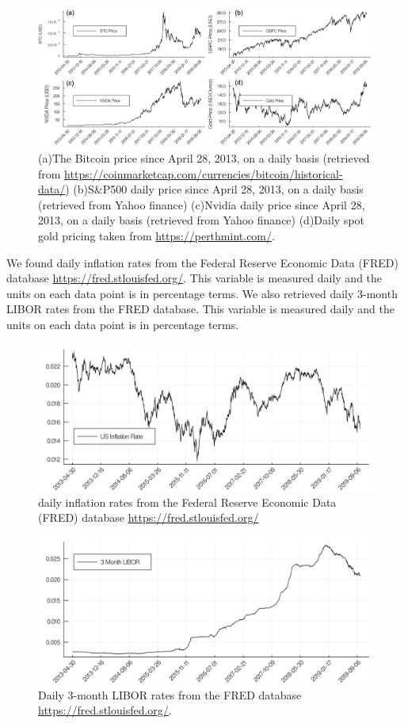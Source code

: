 \documentclass[9pt,twocolumn,twoside]{ilcss}
\begin{document}
\begin{figure}
\centering
\includegraphics[width=0.85\linewidth]{fig1to4.png}
\caption{(a)The Bitcoin price since April 28, 2013, on a daily basis (retrieved from \url{https://coinmarketcap.com/currencies/bitcoin/historical-data/}) (b)S\&P500 daily price since April 28, 2013, on a daily basis (retrieved from Yahoo finance) (c)Nvidia daily price since April 28, 2013, on a daily basis (retrieved from Yahoo finance) (d)Daily spot gold pricing taken from \url{https://perthmint.com/}.}
\label{BTC_GSPC_NVDA_Gold}
\end{figure}

We found daily inflation rates from the Federal Reserve Economic Data (FRED) database \url{https://fred.stlouisfed.org/}. This variable is measured daily and the units on each data point is in percentage terms. We also retrieved daily 3-month LIBOR rates from the FRED database. This variable is measured daily and the units on each data point is in percentage terms. 

\begin{figure}[tbhp]
\centering
\includegraphics[width=.85\linewidth]{US_inflation_rate.png}
\caption{daily inflation rates from the Federal Reserve Economic Data (FRED) database \url{https://fred.stlouisfed.org/}}
\label{infl_rate}
\end{figure}

\begin{figure}[tbhp]
\centering
\includegraphics[width=.85\linewidth]{3_month_LIBOR.png}
\caption{Daily 3-month LIBOR rates from the FRED database \url{https://fred.stlouisfed.org/}.}
\label{3m_LIBOR}
\end{figure}
\end{document}
